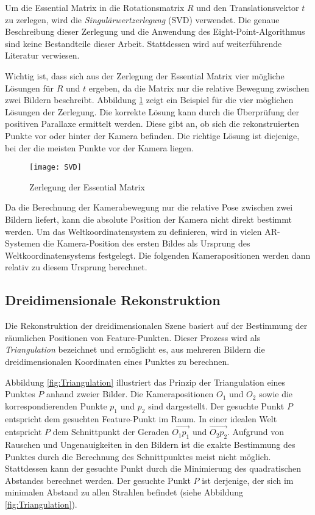 Um die Essential Matrix in die Rotationsmatrix \( R \) und den Translationsvektor \( t \) zu zerlegen, wird die \emph{Singulärwertzerlegung} (SVD) verwendet. Die genaue Beschreibung dieser Zerlegung und die Anwendung des Eight-Point-Algorithmus sind keine Bestandteile dieser Arbeit. Stattdessen wird auf weiterführende Literatur verwiesen. \cite{gao2021vSLAM, tsai1984svd, hartley1997eightpoint}

Wichtig ist, dass sich aus der Zerlegung der Essential Matrix vier mögliche Lösungen für \( R \) und \( t \) ergeben, da die Matrix nur die relative Bewegung zwischen zwei Bildern beschreibt. Abbildung \ref{fig:SVD} zeigt ein Beispiel für die vier möglichen Lösungen der Zerlegung. Die korrekte Lösung kann durch die Überprüfung der positiven Parallaxe ermittelt werden. Diese gibt an, ob sich die rekonstruierten Punkte vor oder hinter der Kamera befinden. Die richtige Lösung ist diejenige, bei der die meisten Punkte vor der Kamera liegen. \cite{gao2021vSLAM}

\begin{figure}
    \centering
    \texttt{[image: SVD]}
    \caption{Zerlegung der Essential Matrix \cite{gao2021vSLAM}\label{fig:SVD}}\par
\end{figure}

Da die Berechnung der Kamerabewegung nur die relative Pose zwischen zwei Bildern liefert, kann die absolute Position der Kamera nicht direkt bestimmt werden. Um das Weltkoordinatensystem zu definieren, wird in vielen AR-Systemen die Kamera-Position des ersten Bildes als Ursprung des Weltkoordinatensystems festgelegt. Die folgenden Kamerapositionen werden dann relativ zu diesem Ursprung berechnet. \cite{gao2021vSLAM,appledevdoc}

\subsection{Dreidimensionale Rekonstruktion}

Die Rekonstruktion der dreidimensionalen Szene basiert auf der Bestimmung der räumlichen Positionen von Feature-Punkten. Dieser Prozess wird als \emph{Triangulation} bezeichnet und ermöglicht es, aus mehreren Bildern die dreidimensionalen Koordinaten eines Punktes zu berechnen. \cite{gao2021vSLAM}

Abbildung \ref{fig:Triangulation} illustriert das Prinzip der Triangulation eines Punktes \( P \) anhand zweier Bilder. Die Kamerapositionen \( O_1 \) und \( O_2 \) sowie die korrespondierenden Punkte \( p_1 \) und \( p_2 \) sind dargestellt. Der gesuchte Punkt \( P \) entspricht dem gesuchten Feature-Punkt im Raum. In einer idealen Welt entspricht \( P \) dem Schnittpunkt der Geraden \( \overrightarrow{O_1p_1} \) und \( \overrightarrow{O_2p_2} \). Aufgrund von Rauschen und Ungenauigkeiten in den Bildern ist die exakte Bestimmung des Punktes durch die Berechnung des Schnittpunktes meist nicht möglich. Stattdessen kann der gesuchte Punkt durch die Minimierung des quadratischen Abstandes berechnet werden. Der gesuchte Punkt \( P \) ist derjenige, der sich im minimalen Abstand zu allen Strahlen befindet (siehe Abbildung \ref{fig:Triangulation}). \cite{gao2021vSLAM}

